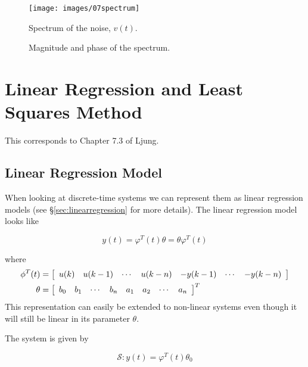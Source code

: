 \begin{figure}[ht!]
\centering
\texttt{[image: images/07spectrum]}
\caption{Spectrum of the noise, $v(t)$.}%
\label{fig:07spectrum}
\end{figure}

\begin{figure}[ht!]
\centering
{} \hfill
{} \hfill
\caption{Magnitude and phase of the spectrum.}%
\label{fig:07magphase}
\end{figure}

\section{Linear Regression and Least Squares Method}
This corresponds to Chapter 7.3 of Ljung.

\subsection{Linear Regression Model}
When looking at discrete-time systems we can represent them as linear regression models (see \S\ref{sec:linearregression} for more details).
The linear regression model looks like

\begin{equation*}
y(t) = \varphi^T(t)\theta = \theta\varphi^T(t)
\end{equation*}

where
\begin{align*}
\phi^T(t) &= \left[\begin{array}{c c c c c c c}
u(k) & u(k-1) & \cdots & u(k-n) & -y(k-1) & \cdots & -y(k-n) \end{array}\right] \\
\theta{} &= \left[\begin{array}{c c c c c c c c}
b_0 & b_1 & \cdots & b_n & a_1 & a_2 & \cdots & a_n \end{array}\right]^T
\end{align*}
This representation can easily be extended to non-linear systems even though it will still be linear in its parameter $\theta$.

The system is given by

\begin{equation*}
\mathcal{S}: y(t) = \varphi^T(t)\theta_0
\end{equation*}

